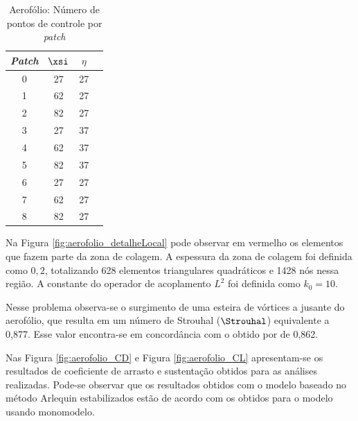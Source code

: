 \begin{table}[h]
	\caption{Aerofólio: Número de pontos de controle por \textit{patch}}
	\label{tab:aerofolio_discretização_patches}
	\centering
	\begin{minipage}{0.49\textwidth}
		\centering
		\begin{tabular}{cccc} 
			\toprule
			\textit{Patch} & $\xsi$ & $\eta$\\ 
			\midrule \midrule
			0 & 27 & 27\\
			\midrule
			1 & 62 & 27\\
			\midrule
			2 & 82 & 27\\
			\midrule
			3 & 27 & 37\\
			\midrule
			4 & 62 & 37\\
			\midrule
			5 & 82 & 37\\ 
			\midrule
			6 & 27 & 27\\ 
			\midrule
			7 & 62 & 27\\ 
			\midrule
			8 & 82 & 27\\ 
			\bottomrule
		\end{tabular}
	\end{minipage}%
\end{table}

Na Figura \ref{fig:aerofolio_detalheLocal} pode observar em vermelho os elementos que fazem parte da zona de colagem. A espessura da zona de colagem foi definida como $0,2$, totalizando 628 elementos triangulares quadráticos e 1428 nós nessa região. A constante do operador de acoplamento $L^{2}$ foi definida como $k_{0} = 10$. 

Nesse problema observa-se o surgimento de uma esteira de vórtices a jusante do aerofólio, que resulta em um número de Strouhal ($\Strouhal$) equivalente a 0,877. Esse valor encontra-se em concordância com o obtido por  de 0,862. 

Nas Figura \ref{fig:aerofolio_CD} e Figura \ref{fig:aerofolio_CL} apresentam-se os resultados de coeficiente de arrasto e sustentação obtidos para as análises realizadas. Pode-se observar que os resultados obtidos com o modelo baseado no método Arlequin estabilizados estão de acordo com os obtidos para o modelo usando monomodelo.

